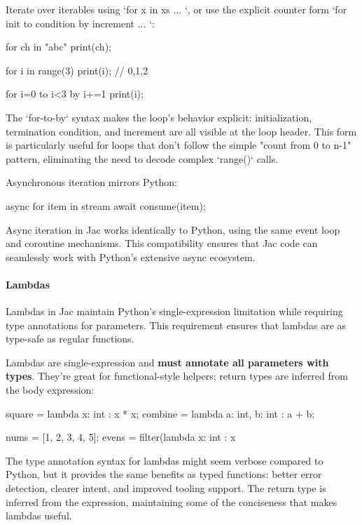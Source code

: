 Iterate over iterables using `for x in xs { ... }`, or use the explicit counter form `for init to condition by increment { ... }`:

\begin{jacblock}
for ch in "abc" { print(ch); }

for i in range(3) {
    print(i);  // 0,1,2
}

for i=0 to i<3 by i+=1 {
    print(i);
}
\end{jacblock}

The `for-to-by` syntax makes the loop's behavior explicit: initialization, termination condition, and increment are all visible at the loop header. This form is particularly useful for loops that don't follow the simple "count from 0 to n-1" pattern, eliminating the need to decode complex `range()` calls.

Asynchronous iteration mirrors Python:

\begin{jacblock}
async for item in stream {
    await consume(item);
}
\end{jacblock}

Async iteration in Jac works identically to Python, using the same event loop and coroutine mechanisms. This compatibility ensures that Jac code can seamlessly work with Python's extensive async ecosystem.

\paragraph{Lambdas}

Lambdas in Jac maintain Python's single-expression limitation while requiring type annotations for parameters. This requirement ensures that lambdas are as type-safe as regular functions.

Lambdas are single-expression and \textbf{must annotate all parameters with types}. They're great for functional-style helpers; return types are inferred from the body expression:

\begin{jacblock}
square = lambda x: int : x * x;
combine = lambda a: int, b: int : a + b;

nums = [1, 2, 3, 4, 5];
evens = filter(lambda x: int : x %
\end{jacblock}

The type annotation syntax for lambdas might seem verbose compared to Python, but it provides the same benefits as typed functions: better error detection, clearer intent, and improved tooling support. The return type is inferred from the expression, maintaining some of the conciseness that makes lambdas useful.

